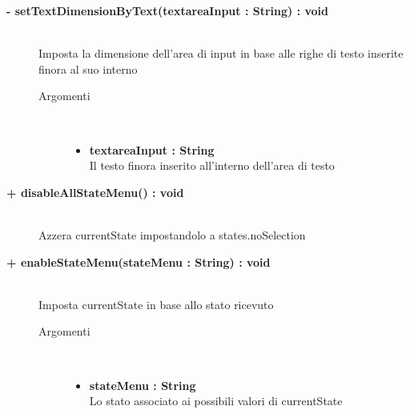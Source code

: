 \begin{description}
	\begin{description}
		\item[\textbf{\color{blue}- setTextDimensionByText(textareaInput : String) : void		}] \hfill \\
			Imposta la dimensione dell'area di input in base alle righe di testo inserite finora al suo interno
			
		\begin{description}
			\item[Argomenti] \hfill \\
				\begin{itemize}
				
					\item \textbf{textareaInput : String		} \hfill \\
					Il testo finora inserito all'interno dell'area di testo
					
				\end{itemize}
			
		\end{description}
	\end{description}
	
	\begin{description}
		\item[\textbf{\color{blue}+ disableAllStateMenu() : void		}] \hfill \\
			Azzera currentState impostandolo a states.noSelection
			
	\end{description}
	
	\begin{description}
		\item[\textbf{\color{blue}+ enableStateMenu(stateMenu : String) : void		}] \hfill \\
			Imposta currentState in base allo stato ricevuto
			
		\begin{description}
			\item[Argomenti] \hfill \\
				\begin{itemize}
				
					\item \textbf{stateMenu : String		} \hfill \\
					Lo stato associato ai possibili valori di currentState
					

\end{itemize}
\end{description}
\end{description}
\end{description}
